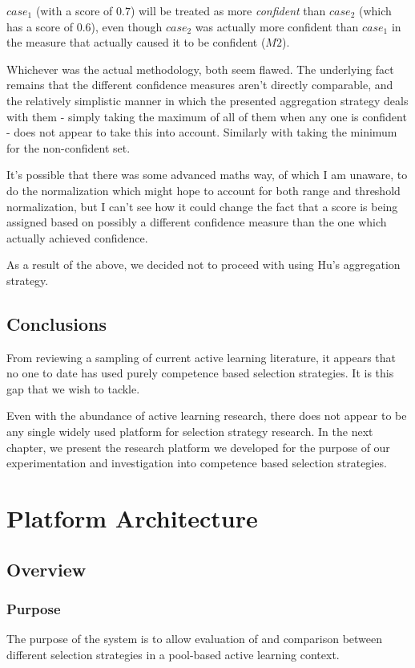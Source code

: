 \documentclass[a4paper,11pt]{report}
\begin{document}
\begin{enumerate}
	$case_{1}$ (with a score of $0.7$) will be treated as more \emph{confident} than $case_{2}$ (which has a score of $0.6$), even though $case_{2}$ was actually more confident than $case_{1}$ in the measure that actually caused it to be confident ($M2$).
	
\end{enumerate}

Whichever was the actual methodology, both seem flawed. The underlying fact remains that the different confidence measures aren't directly comparable, and the relatively simplistic manner in which the presented aggregation strategy deals with them - simply taking the maximum of all of them when any one is confident - does not appear to take this into account. Similarly with taking the minimum for the non-confident set.

It's possible that there was some advanced maths way, of which I am unaware, to do the normalization which might hope to account for both range and threshold normalization, but I can't see how it could change the fact that a score is being assigned based on possibly a different confidence measure than the one which actually achieved confidence.

As a result of the above, we decided not to proceed with using Hu's aggregation strategy.

\section{Conclusions}
From reviewing a sampling of current active learning literature, it appears that no one to date has used purely competence based selection strategies. It is this gap that we wish to tackle. 

Even with the abundance of active learning research, there does not appear to be any single widely used platform for selection strategy research. In the next chapter, we present the research platform we developed for the purpose of our experimentation and investigation into competence based selection strategies.

\chapter{Platform Architecture\label{cha:platarch}}
\section{Overview}
\subsection{Purpose}
The purpose of the system is to allow evaluation of and comparison between different selection strategies in a pool-based active learning context.
\end{document}
